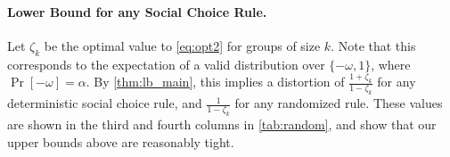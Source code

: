 \paragraph{Lower Bound for any  Social Choice Rule.} 
Let $\zeta_k$ be the optimal value to \cref{eq:opt2} for groups of size $k$. Note that this corresponds to the expectation of a valid distribution over $\{-\omega, 1\}$, where $\Pr[-\omega] = \alpha$. By \cref{thm:lb_main}, this implies a distortion of $\frac{1+\zeta_k}{1-\zeta_k}$ for any deterministic social choice rule, and $\frac{1}{1-\zeta_k}$ for any randomized rule. These values are shown in the third and fourth columns in \cref{tab:random}, and show that our upper bounds above are reasonably tight.  %


